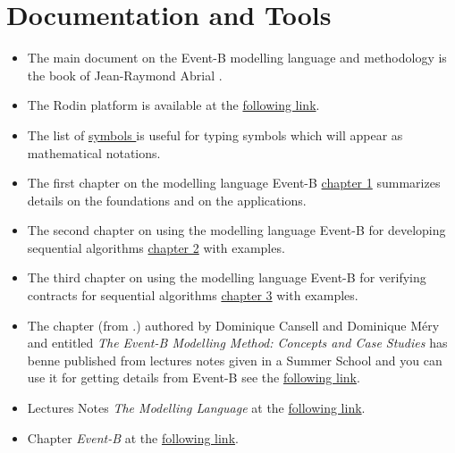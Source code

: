 \documentclass[ 12pt]{article}
\begin{document}
\tableofcontents


\section{Documentation and Tools}




\begin{itemize}

\item[]  The main document on the Event-B  modelling language and
  methodology is the book of Jean-Raymond Abrial \cite{abrial2010}.

  
  
\item[]  The Rodin platform is available at the 
  \href{https://www.event-b.org/install.html}{following 
    link}.


  
\item[]  The list of 
  \href{http://mery54.github.io/teaching/mosos/lecturesnotes/symboles.pdf}{
    symbols } is useful for   typing symbols  which  will appear as 
  mathematical notations.



\item[]  The first chapter on the modelling language Event-B
  \href{http://mery54.github.io/teaching/mosos/lecturesnotes/main-C1.pdf}{chapter
  1} summarizes    details on the foundations and on the applications.


\item[]  The second  chapter on using the modelling language Event-B
  for developing sequential algorithms
  \href{http://mery54.github.io/teaching/mosos/lecturesnotes/main-C2.pdf}{chapter
  2}  with examples.



\item[]  The third  chapter on using the modelling language Event-B
  for verifying contracts for  sequential algorithms
  \href{http://mery54.github.io/teaching/mosos/lecturesnotes/main-fmt.pdf}{chapter
  3}  with examples.


  
\item[]  The chapter \cite{losl-b} (from \cite{losl-eatcs}.)  authored
  by Dominique Cansell and   Dominique Méry and entitled  \textit{The
    Event-B Modelling   Method: Concepts and Case        Studies} has
  benne published from lectures notes given in a Summer School and you can use it for
getting details from  Event-B   see  the  \href{http://mery54.github.io/teaching/mosos/lecturesnotes/BasicEventB.pdf}{following
  link}.

\item[]  Lectures Notes   \textit{The Modelling Language} at the 
  \href{http://mery54.github.io/teaching/mosos/lecturesnotes/main-Poly1.pdf}{following 
    link}.



  
\item[]  Chapter   \textit{Event-B} at the 
  \href{http://mery54.github.io/teaching/mosos/lecturesnotes/Chapter10.pdf}{following     link}.



  
\end{itemize}
\end{document}
